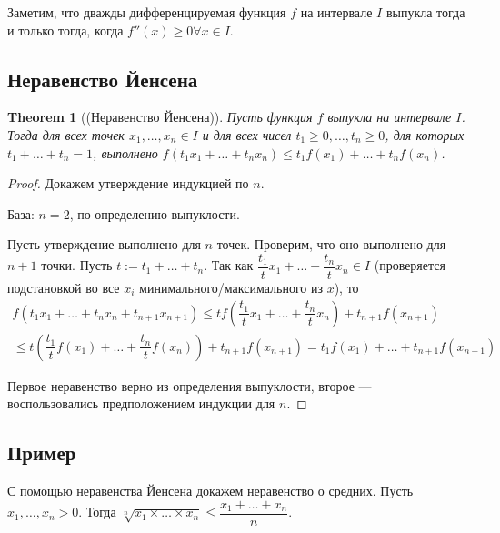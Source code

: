 \documentclass[a4paper]{article}
\theoremstyle{named}
\newtheorem*{namedtheorem}{Theorem}
\begin{document}
        Заметим, что дважды дифференцируемая функция $f$ на интервале $I$ выпукла тогда и только тогда, когда $f''(x) \geq 0 \forall x \in I$.

        \subsection{Неравенство Йенсена}

        \begin{namedtheorem}[(Неравенство Йенсена)]
            Пусть функция $f$ выпукла на интервале $I$. Тогда для всех точек $x_1, \dots, x_n \in I$ и для всех чисел $t_1 \geq 0, \dots, t_n \geq 0$, для которых $t_1 + \dots + t_n = 1$, выполнено $f(t_1x_1 + \dots + t_nx_n) \leq t_1f(x_1) + \dots + t_nf(x_n)$.
        \end{namedtheorem}

        \begin{proof}
            Докажем утверждение индукцией по $n$.

            База: $n = 2$, по определению выпуклости.

            Пусть утверждение выполнено для $n$ точек. Проверим, что оно выполнено для $n + 1$ точки. Пусть $t := t_1 + \dots + t_n$. Так как $\dfrac{t_1}{t}x_1 + \dots + \dfrac{t_n}{t}x_n \in I$ (проверяется подстановкой во все $x_i$ минимального/максимального из $x$), то
            \[\begin{gathered}
                f(t_1x_1 + \dots + t_nx_n + t_{n + 1}x_{n + 1}) \leq tf \left(\dfrac{t_1}{t}x_1 + \dots + \dfrac{t_n}{t}x_n\right) + t_{n + 1}f(x_{n + 1}) \\
                \leq t \left(\dfrac{t_1}{t}f(x_1) + \dots + \dfrac{t_n}{t}f(x_n)\right) + t_{n + 1}f(x_{n + 1}) = t_1f(x_1) + \dots + t_{n + 1}f(x_{n + 1})
            \end{gathered}\]

            Первое неравенство верно из определения выпуклости, второе --- воспользовались предположением индукции для $n$.
        \end{proof}

        \subsection{Пример}

        С помощью неравенства Йенсена докажем неравенство о средних. Пусть $x_1, \dots, x_n > 0$. Тогда $\sqrt[n]{x_1 \times \dots \times x_n} \leq \dfrac{x_1 + \dots + x_n}{n}$.
\end{document}
